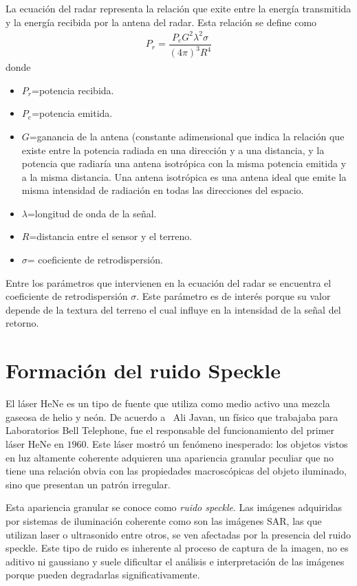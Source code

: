 La ecuación del radar representa la relación que exite entre la energía transmitida y la energía recibida por la antena del radar. Esta relación se define como
\begin{align}
P_r=\dfrac{P_e G^2 \lambda^2 \sigma}{(4 \pi)^3 R^4} 
\end{align}
donde
\begin{itemize}
	\item $P_r$=potencia recibida.
	\item $P_e$=potencia emitida.
	\item $G$=ganancia de la antena (constante adimensional que indica la relación que existe entre la potencia radiada en una dirección y a una distancia, y la  potencia que radiaría una antena isotrópica con la misma potencia emitida y a la misma distancia. Una antena isotrópica es una antena ideal que emite la misma intensidad de radiación en todas las direcciones del espacio.
	\item $\lambda$=longitud de onda de la señal.
	\item $R$=distancia entre el sensor y el terreno.
	\item $\sigma$= coeficiente de retrodispersión.
\end{itemize}

Entre los parámetros que intervienen en la ecuación del radar se encuentra el coeficiente de retrodispersión $\sigma$. Este parámetro es de interés porque su valor depende de la textura del terreno el cual influye en la intensidad de la señal del retorno.

\section{Formación del ruido Speckle}
\label{FormacionSpeckle}

El láser HeNe es un tipo de fuente que utiliza como medio activo una mezcla gaseosa de helio y neón. De acuerdo a~\citet{Goodman1975,Quel1994} Ali Javan, un físico que trabajaba para Laboratorios Bell Telephone, fue el responsable del funcionamiento del primer láser HeNe en $1960$. Este láser  mostró un fenómeno inesperado: los objetos vistos en luz altamente coherente adquieren una apariencia granular peculiar que no tiene una relación obvia con las propiedades macroscópicas del objeto iluminado, sino que presentan un patrón irregular. 

Esta apariencia granular se conoce como \textit{ruido speckle}. Las imágenes adquiridas por sistemas de iluminación coherente como son las imágenes SAR, las que utilizan laser o ultrasonido entre otros, se ven afectadas por la presencia del ruido speckle. Este tipo de ruido es inherente al proceso de captura de la imagen, no es aditivo ni gaussiano y suele dificultar el análisis e interpretación de las imágenes porque pueden degradarlas significativamente.


